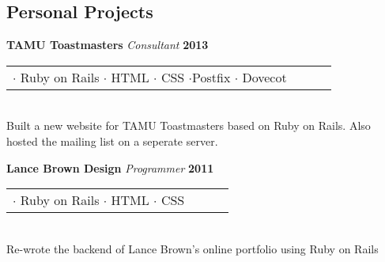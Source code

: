 \documentclass[margin,line]{res}
\begin{document}
{\begin{resume}
\vspace*{.25in}
{\color{WildStrawberry}
  \vspace{-.13in}
  \section{\sc Personal Projects}}
\color{black}
{\bf TAMU Toastmasters} {\em Consultant} \hfill {\bf 2013} \
\\
\begin{tabular}{l l l l}
  $\cdot$ Ruby on Rails $\cdot$ HTML $\cdot$ CSS $\cdot$Postfix
  $\cdot$ Dovecot
\end{tabular}
\\
\hspace*{.14pt}
Built a new website for TAMU Toastmasters based on Ruby on Rails. Also
hosted the mailing list on a seperate server.
\vspace{-.13in}

{\bf Lance Brown Design} {\em Programmer} \hfill {\bf 2011} \
\\
\begin{tabular}{l l l l}
  $\cdot$ Ruby on Rails $\cdot$ HTML $\cdot$ CSS
\end{tabular}
\\
\hspace*{.14pt}
Re-wrote the backend of Lance Brown's online portfolio using Ruby on Rails
\vspace{-.13in}


\end{resume}}
\end{document}
